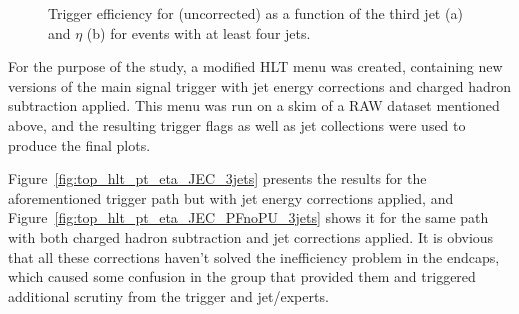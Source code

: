 \begin{figure}[hbtp]
  \centering
  \hfill
  \caption[\HLTThreeCentralPFJet trigger efficiency as a function of the third jet \pt and $\eta$]{Trigger
  efficiency for \HLTThreeCentralPFJet (uncorrected) as a function of the third jet \pt (a) and $\eta$ (b) for events
  with at least four jets.}
\label{fig:top_hlt_pt_eta_4jets} 
\end{figure}


For the purpose of the study, a modified HLT menu was created, containing new versions of the main signal trigger with
jet energy corrections and charged hadron subtraction applied. This menu was run on a \ttbar skim of a RAW dataset
mentioned above, and the resulting trigger flags as well as jet collections were used to produce the final plots.

Figure~\ref{fig:top_hlt_pt_eta_JEC_3jets} presents the results for the aforementioned trigger path but with jet energy
corrections applied, and Figure~\ref{fig:top_hlt_pt_eta_JEC_PFnoPU_3jets} shows it for the same path with both charged
hadron subtraction and jet corrections applied. It is obvious that all these corrections haven't solved the inefficiency
problem in the endcaps, which caused some confusion in the group that provided them and triggered additional scrutiny
from the trigger and jet/\MET experts.

